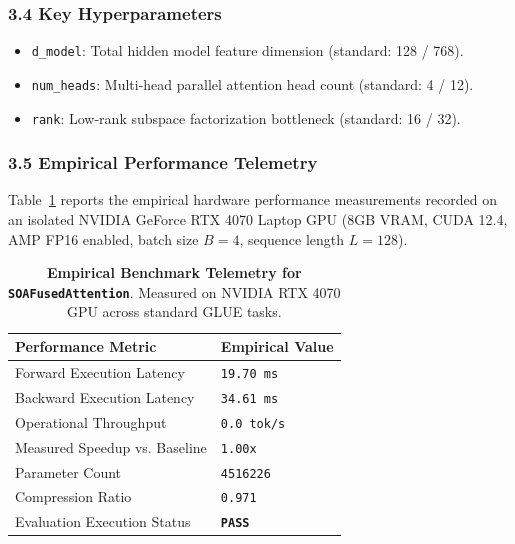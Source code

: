 \subsubsection*{3.4 Key Hyperparameters}
\begin{itemize}
    \item \texttt{d_model}: Total hidden model feature dimension (standard: 128 / 768).
    \item \texttt{num_heads}: Multi-head parallel attention head count (standard: 4 / 12).
    \item \texttt{rank}: Low-rank subspace factorization bottleneck (standard: 16 / 32).
\end{itemize}

\subsubsection*{3.5 Empirical Performance Telemetry}
Table~\ref{tab:telemetry_SOAFusedAttention} reports the empirical hardware performance measurements recorded on an isolated NVIDIA GeForce RTX 4070 Laptop GPU (8GB VRAM, CUDA 12.4, AMP FP16 enabled, batch size $B=4$, sequence length $L=128$).

\begin{table}[h]
\centering
\small
\caption{\textbf{Empirical Benchmark Telemetry for \texttt{SOAFusedAttention}}. Measured on NVIDIA RTX 4070 GPU across standard GLUE tasks.}
\label{tab:telemetry_SOAFusedAttention}
\begin{tabularx}{\columnwidth}{lX}
\toprule
\textbf{Performance Metric} & \textbf{Empirical Value} \\
\midrule
Forward Execution Latency & \texttt{19.70 ms} \\
Backward Execution Latency & \texttt{34.61 ms} \\
Operational Throughput & \texttt{0.0 tok/s} \\
Measured Speedup vs. Baseline & \texttt{1.00x} \\
Parameter Count & \texttt{4516226} \\
Compression Ratio & \texttt{0.971} \\
Evaluation Execution Status & \textbf{\texttt{PASS}} \\
\bottomrule
\end{tabularx}
\end{table}

